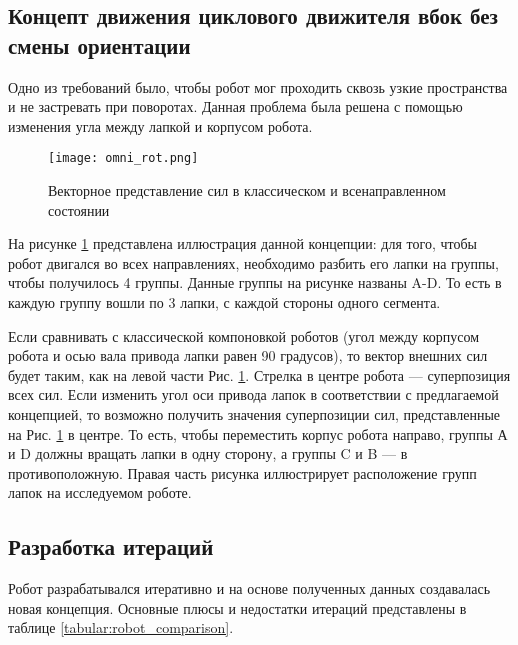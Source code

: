 \subsection{Концепт движения циклового движителя вбок без смены ориентации}

Одно из требований было, чтобы робот мог проходить сквозь узкие пространства и не застревать при поворотах. Данная проблема была решена с помощью изменения угла между лапкой и корпусом робота.

\begin{figure}[H]
    \centering\texttt{[image: omni\_rot.png]}
    \caption{Векторное представление сил в классическом и всенаправленном состоянии}
    \label{fig:omnidirection}
\end{figure}

На рисунке \ref{fig:omnidirection} представлена иллюстрация данной концепции: для того, чтобы робот двигался во всех направлениях, необходимо разбить его лапки на группы, чтобы получилось 4 группы. Данные группы на рисунке названы A-D. То есть в каждую группу вошли по 3 лапки, с каждой стороны одного сегмента.

Если сравнивать с классической компоновкой роботов (угол между корпусом робота и осью вала привода лапки равен 90 градусов), то вектор внешних сил будет таким, как на левой части Рис. \ref{fig:omnidirection}. Стрелка в центре робота — суперпозиция всех сил. Если изменить угол оси привода лапок в соответствии с предлагаемой концепцией, то возможно получить значения суперпозиции сил, представленные на Рис. \ref{fig:omnidirection} в центре. То есть, чтобы переместить корпус робота направо, группы А и D должны вращать лапки в одну сторону, а группы C и B — в противоположную. Правая часть рисунка иллюстрирует расположение групп лапок на исследуемом роботе. 

\subsection{Разработка итераций}
Робот разрабатывался итеративно и на основе полученных данных создавалась новая концепция. Основные плюсы и недостатки итераций представлены в таблице \ref{tabular:robot_comparison}.

